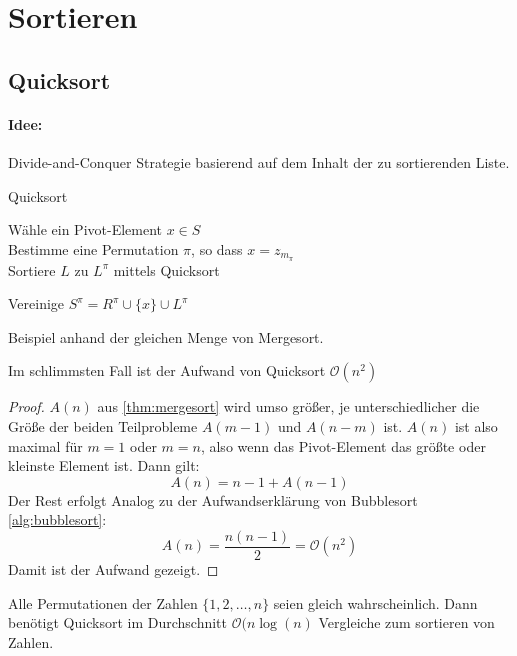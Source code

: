 \section{Sortieren}


\subsection{Quicksort}
\paragraph{Idee:} Divide-and-Conquer Strategie basierend auf dem Inhalt der zu sortierenden Liste.
\begin{algorithm}
\label{alg:quicksort}
\caption{Quicksort}
	Wähle ein Pivot-Element $x \in S$ \\
	Bestimme eine Permutation $\pi$, so dass $x=z_{m_{\pi}}$\\
	{
	Sortiere $L$ zu $L^{\pi}$ mittels Quicksort
	}

	Vereinige $S^{\pi}= R^{\pi} \cup \{x\} \cup L^{\pi}$
\end{algorithm}
\begin{example}
Beispiel anhand der gleichen Menge von Mergesort.
\end{example}
\begin{lemma}
Im schlimmsten Fall ist der Aufwand von Quicksort $\mathcal{O}(n^2)$
\end{lemma}
\begin{proof}
$A(n)$ aus \ref{thm:mergesort} wird umso größer, je unterschiedlicher die Größe der beiden Teilprobleme $A(m-1)$ und $A(n-m)$ ist.
$A(n)$ ist also maximal für $m=1$ oder $m=n$, also wenn das Pivot-Element das größte oder kleinste Element ist. Dann gilt:
\[
A(n)=n-1+A(n-1)
\]
Der Rest erfolgt Analog zu der Aufwandserklärung von Bubblesort \ref{alg:bubblesort}:
\[
A(n)=\frac{n(n-1)}{2}= \mathcal{O}(n^2)
\]
Damit ist der Aufwand gezeigt.
\end{proof}
\begin{theorem}
	Alle Permutationen der Zahlen $\{1,2,\ldots,n\}$ seien gleich wahrscheinlich. Dann benötigt Quicksort im Durchschnitt $\mathcal{O}(n\log(n)$ Vergleiche zum sortieren von Zahlen.
\end{theorem}
